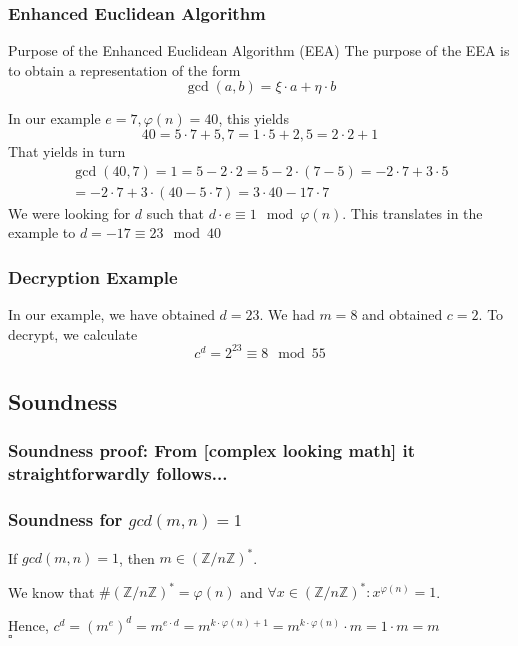 \documentclass{beamer}
\begin{document}
\begin{frame}\frametitle{Enhanced Euclidean Algorithm}
\begin{block}{Purpose of the Enhanced Euclidean Algorithm (EEA)}
The purpose of the EEA is to obtain a representation of the form \[\gcd(a,b)=\xi\cdot a+\eta\cdot b\]
\end{block}\pause

In our example $e=7, \varphi(n)=40$, \pause this yields \[40=5\cdot 7+5, 7=1\cdot 5+2,
5=2\cdot 2+1\] \pause That yields in turn \[\begin{split}\gcd(40,7)=1=5-2\cdot 2=5-2\cdot(7-5)=-2\cdot 7+3\cdot 5\\=-2\cdot 7+3\cdot(40-5\cdot 7)=3\cdot 40-17\cdot 7\end{split}\]\pause
We were looking for $d$ such that $d\cdot e\equiv 1\mod\varphi(n)$. This translates in the example to $d=-17\equiv 23\mod 40$
\end{frame}
\begin{frame}
\frametitle{Decryption Example}
In our example, we have obtained $d=23$.
We had $m=8$ and obtained $c=2$. To decrypt, we calculate \[c^d=2^{23}\equiv 8\mod 55\]
\only\begin{figure}
\end{figure}
\end{frame}

\subsection{Soundness}
\begin{frame}
\frametitle{Soundness proof: From [complex looking math] it straightforwardly follows...}
\begin{figure}
\end{figure}
\end{frame}
\begin{frame}
\frametitle{Soundness for $gcd(m,n)=1$}
If $gcd(m,n)=1$, then $m\in\left(\mathbb{Z}/n\mathbb{Z}\right)^*$. \pause

We know that $\#\left(\mathbb{Z}/n\mathbb{Z}\right)^*=\varphi(n)$ and $\forall x\in \left(\mathbb{Z}/n\mathbb{Z}\right)^*: x^{\varphi(n)}=1$.\pause

Hence, $c^d=\left(m^e\right)^d=m^{e\cdot d}=m^{k\cdot\varphi(n) +1}=m^{k\cdot\varphi(n)}\cdot m=1\cdot m=m$ \\\flushright$\square$
\end{frame}
\end{document}
